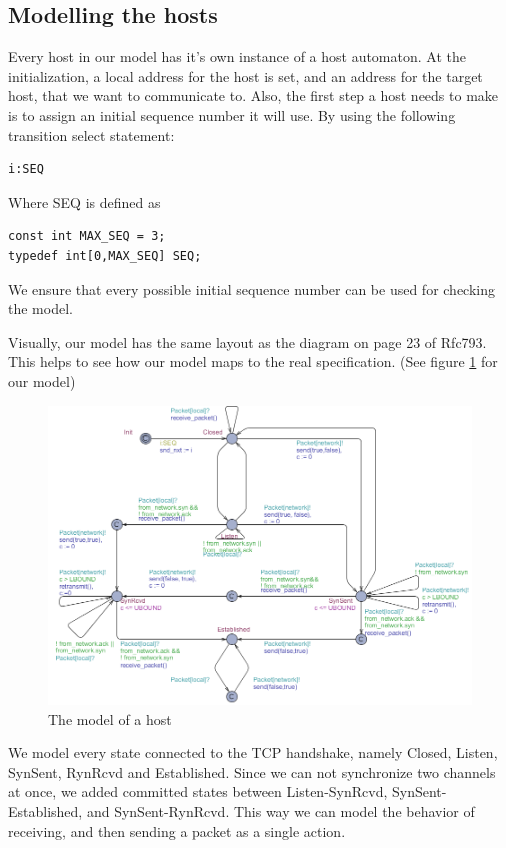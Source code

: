 \documentclass[twocolumn]{article}
\begin{document}
\subsection{Modelling the hosts}
Every host in our model has it's own instance of a host automaton. At the initialization, a local address for the host is set, and an address for the target host, that we want to communicate to. Also, the first step a host needs to make is to assign an initial sequence number it will use.
By using the following transition select statement:
\begin{verbatim}i:SEQ
\end{verbatim}
Where SEQ is defined as 
\begin{verbatim}const int MAX_SEQ = 3;
typedef int[0,MAX_SEQ] SEQ;
\end{verbatim}
We ensure that every possible initial sequence number can be used for checking the model.

Visually, our model has the same layout as the diagram on page 23 of Rfc793. This helps to see how our model maps to the real specification. (See figure \ref{fig:figure2} for our model)
\begin{figure}
  \includegraphics[scale=0.55]{host_model} %
  \caption{The model of a host}
  \label{fig:figure2}
\end{figure}
We model every state connected to the TCP handshake, namely Closed, Listen, SynSent, RynRcvd and Established. Since we can not synchronize two channels at once, we added committed states between Listen-SynRcvd, SynSent-Established, and SynSent-RynRcvd. This way we can model the behavior of receiving, and then sending a packet as a single action.
\end{document}
